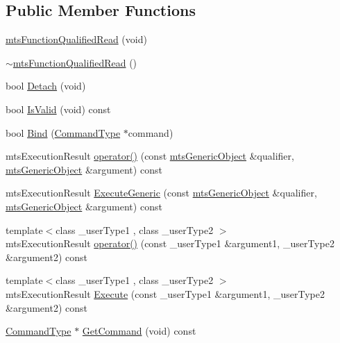 \subsection*{Public Member Functions}
\begin{DoxyCompactItemize}
\item 
\hyperlink{classmts_function_qualified_read_a1776e3e0648e47435d9460b1e964140f}{mts\+Function\+Qualified\+Read} (void)
\item 
\hyperlink{classmts_function_qualified_read_a2d4381507c8d8b10f6b59187b6c67416}{$\sim$mts\+Function\+Qualified\+Read} ()
\item 
bool \hyperlink{classmts_function_qualified_read_a6e2358ffab4ae5da9acb8a4606c613f8}{Detach} (void)
\item 
bool \hyperlink{classmts_function_qualified_read_a521833fa551ad5e8f79492cd88d3df14}{Is\+Valid} (void) const 
\item 
bool \hyperlink{classmts_function_qualified_read_a0f89963fbe16521ab4d716c89a64d0c8}{Bind} (\hyperlink{classmts_function_qualified_read_ae78bcee54ee0392f510d2f33600c316f}{Command\+Type} $\ast$command)
\item 
mts\+Execution\+Result \hyperlink{classmts_function_qualified_read_a6a337f5f2c1f735f54b54b2610dd9c86}{operator()} (const \hyperlink{classmts_generic_object}{mts\+Generic\+Object} \&qualifier, \hyperlink{classmts_generic_object}{mts\+Generic\+Object} \&argument) const 
\item 
mts\+Execution\+Result \hyperlink{classmts_function_qualified_read_a7dd735595d526646a659c89e79d43c7b}{Execute\+Generic} (const \hyperlink{classmts_generic_object}{mts\+Generic\+Object} \&qualifier, \hyperlink{classmts_generic_object}{mts\+Generic\+Object} \&argument) const 
\item 
{\footnotesize template$<$class \+\_\+user\+Type1 , class \+\_\+user\+Type2 $>$ }\\mts\+Execution\+Result \hyperlink{classmts_function_qualified_read_a8c5c10827c54908449f9c969a79135f8}{operator()} (const \+\_\+user\+Type1 \&argument1, \+\_\+user\+Type2 \&argument2) const 
\item 
{\footnotesize template$<$class \+\_\+user\+Type1 , class \+\_\+user\+Type2 $>$ }\\mts\+Execution\+Result \hyperlink{classmts_function_qualified_read_aedfbc1198c539525c27c5ae5316e3fa0}{Execute} (const \+\_\+user\+Type1 \&argument1, \+\_\+user\+Type2 \&argument2) const 
\item 
\hyperlink{classmts_function_qualified_read_ae78bcee54ee0392f510d2f33600c316f}{Command\+Type} $\ast$ \hyperlink{classmts_function_qualified_read_a4ccdb978f5633cd5c791f9830341c65c}{Get\+Command} (void) const 

\end{DoxyCompactItemize}
